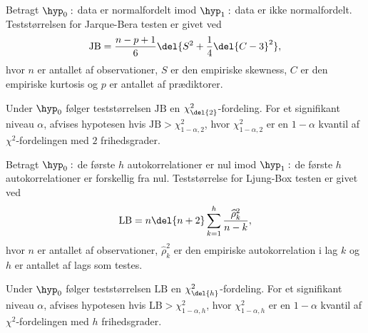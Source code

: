 %
\begin{defn} \label{def:jbtest}
Betragt \(\hyp_0: \) data er normalfordelt imod \(\hyp_1:\) data er ikke normalfordelt.
Teststørrelsen for Jarque-Bera testen er givet ved
\begin{align*}
\text{JB} = \frac{n-p+1}{6} \del{S^2 + \frac{1}{4} \del{C-3}^2},
\end{align*}
hvor \(n\) er antallet af observationer, \(S\) er den empiriske skewness, \(C\) er den empiriske kurtosis og \(p\) er antallet af prædiktorer.
\end{defn}
Under \(\hyp_0\) følger teststørrelsen \(\text{JB}\) en \(\chi_{\del{2}}^2\)-fordeling.
For et signifikant niveau \(\alpha\), afvises hypotesen hvis \(\text{JB} > \chi_{1-\alpha,2}^2\), hvor \(\chi_{1-\alpha,2}^2\) er en \(1 - \alpha\) kvantil af \(\chi^2\)-fordelingen med \(2\) frihedsgrader.
%
\begin{defn} \label{def:lbtest}
Betragt \(\hyp_0 :\) de første \(h\) autokorrelationer er nul imod \(\hyp_1 :\) de første \(h\) autokorrelationer er forskellig fra nul.
Teststørrelse for Ljung-Box testen er givet ved
\begin{align*}
\text{LB} = n \del{n +2} \sum_{k=1}^h \frac{\widehat{\rho}_k^2}{n-k},
\end{align*}
hvor \(n\) er antallet af observationer, \(\widehat{\rho}_k^2\) er den empiriske autokorrelation i lag \(k\) og \(h\) er antallet af lags som testes.
\end{defn}
Under \(\hyp_0\) følger teststørrelsen \(\text{LB}\) en \(\chi_{\del{h}}^2\)-fordeling.
For et signifikant niveau \(\alpha\), afvises hypotesen hvis \(\text{LB} > \chi_{1-\alpha,h}^2\), hvor \(\chi_{1-\alpha,h}^2\) er en \(1 - \alpha\) kvantil af \(\chi^2\)-fordelingen med \(h\) frihedsgrader.